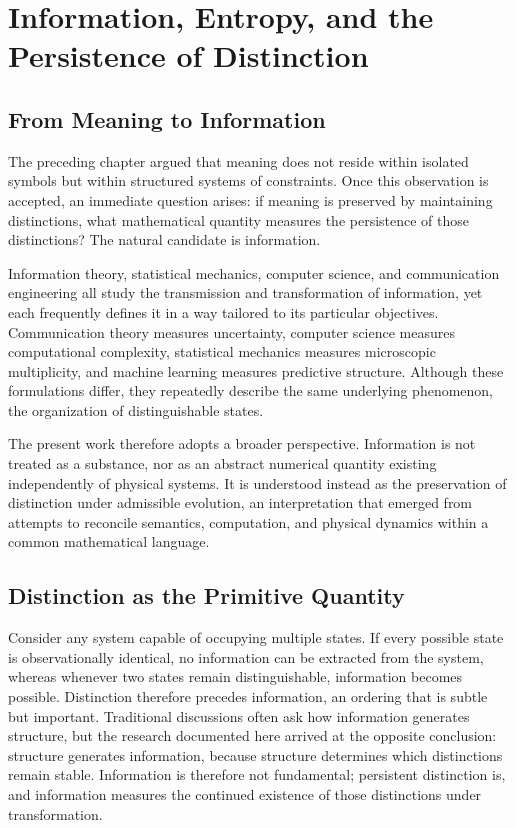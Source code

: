\documentclass[11pt,oneside]{book}
\numberwithin{equation}{chapter}
\theoremstyle{definition}
\theoremstyle{plain}
\begin{document}
\chapter{Information, Entropy, and the Persistence of Distinction}

\section{From Meaning to Information}

The preceding chapter argued that meaning does not reside within isolated symbols but within structured systems of constraints. Once this observation is accepted, an immediate question arises: if meaning is preserved by maintaining distinctions, what mathematical quantity measures the persistence of those distinctions? The natural candidate is information.

Information theory, statistical mechanics, computer science, and communication engineering all study the transmission and transformation of information, yet each frequently defines it in a way tailored to its particular objectives. Communication theory measures uncertainty, computer science measures computational complexity, statistical mechanics measures microscopic multiplicity, and machine learning measures predictive structure. Although these formulations differ, they repeatedly describe the same underlying phenomenon, the organization of distinguishable states.

The present work therefore adopts a broader perspective. Information is not treated as a substance, nor as an abstract numerical quantity existing independently of physical systems. It is understood instead as the preservation of distinction under admissible evolution, an interpretation that emerged from attempts to reconcile semantics, computation, and physical dynamics within a common mathematical language.

\section{Distinction as the Primitive Quantity}

Consider any system capable of occupying multiple states. If every possible state is observationally identical, no information can be extracted from the system, whereas whenever two states remain distinguishable, information becomes possible. Distinction therefore precedes information, an ordering that is subtle but important. Traditional discussions often ask how information generates structure, but the research documented here arrived at the opposite conclusion: structure generates information, because structure determines which distinctions remain stable. Information is therefore not fundamental; persistent distinction is, and information measures the continued existence of those distinctions under transformation.
\end{document}
